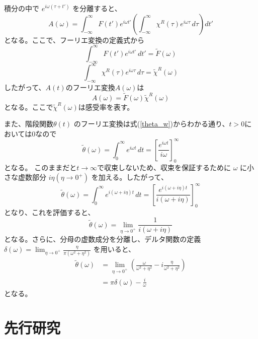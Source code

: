 \documentclass[11pt,a4j]{jreport}
\begin{document}
積分の中で $e^{i \omega (\tau + t')}$ を分離すると、
\begin{equation}
  A(\omega)= \int_{-\infty}^{\infty} F(t') e^{i \omega t'} \left( \int_{-\infty}^{\infty} \chi^R(\tau) e^{i \omega \tau} \, d\tau \right) dt'
\end{equation}
となる。ここで、フーリエ変換の定義式から
\begin{equation}
  \int_{-\infty}^{\infty} F(t') e^{i \omega t'} \, dt' = \tilde{F}(\omega)
\end{equation}
\begin{equation}
  \int_{-\infty}^{\infty} \chi^R(\tau) e^{i \omega \tau} \, d\tau = \tilde{\chi}^R(\omega)
\end{equation}
したがって、$A(t)$のフーリエ変換$A(\omega)$は
\begin{equation}
  A(\omega)= \tilde{F}(\omega) \tilde{\chi}^R(\omega)
\end{equation}
となる。ここで$\tilde{\chi}^R(\omega)$は感受率を表す。\par
また、階段関数$\theta(t)$ のフーリエ変換は式(\ref{theta_w})からわかる通り、$t>0$においては$0$なので
\begin{equation}
  \tilde{\theta}(\omega) = \int_{0}^{\infty} e^{i \omega t} \, dt = \left[ \frac{e^{i \omega t}}{i \omega} \right]_{0}^{\infty}
\end{equation}
となる。
このままだと$t \to \infty$で収束しないため、収束を保証するために $\omega$ に小さな虚数部分 $i \eta(\eta \to 0^+)$ を加える。したがって、
\begin{equation}
  \tilde{\theta}(\omega) = \int_{0}^{\infty} e^{i (\omega + i \eta) t} \, dt = \left[ \frac{e^{i (\omega + i \eta) t}}{i (\omega + i \eta)} \right]_{0}^{\infty}
\end{equation}
となり、これを評価すると、
\begin{equation}
  \tilde{\theta}(\omega) = \lim_{\eta \to 0^+} \frac{1}{i (\omega + i \eta)}
\end{equation}
となる。さらに、分母の虚数成分を分離し、デルタ関数の定義 $\delta(\omega) = \lim_{\eta \to 0^+} \frac{\eta}{\pi (\omega^2 + \eta^2)}$ を用いると、
\begin{align}
  \tilde{\theta}(\omega) &= \lim_{\eta \to 0^+} \left( \frac{\omega}{\omega^2 + \eta^2} - i \frac{\eta}{\omega^2 + \eta^2} \right)\\
  &= \pi \delta(\omega) - \frac{i}{\omega}
\end{align}
となる。

\chapter{先行研究}
\end{document}
